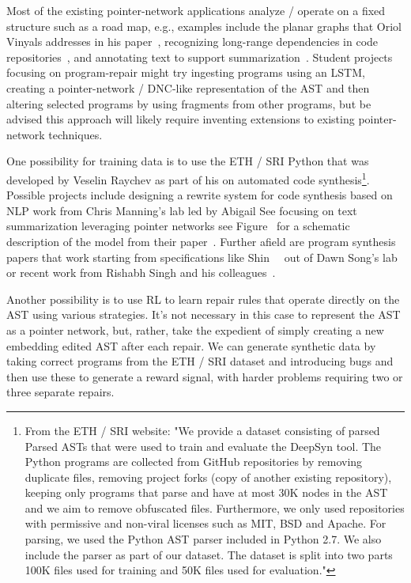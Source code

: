 Most of the existing pointer-network applications analyze / operate on a fixed structure such as a road map, e.g., examples include the planar graphs that Oriol Vinyals addresses in his paper~\cite{VinyalsetalNIPS-15}, recognizing long-range dependencies in code repositories~\cite{BhoopchandetalICLR-17}, and annotating text to support summarization~\cite{SeeetalACL-17}. Student projects focusing on program-repair might try ingesting programs using an LSTM, creating a pointer-network / DNC-like representation of the AST and then altering selected programs by using fragments from other programs, but be advised this approach will likely require inventing extensions to existing pointer-network techniques.

One possibility for training data is to use the ETH / SRI Python {} that was developed by Veselin Raychev as part of his {} on automated code synthesis\footnote{%
%
  From the ETH / SRI website: "We provide a dataset consisting of parsed Parsed ASTs that were used to train and evaluate the DeepSyn tool. The Python programs are collected from GitHub repositories by removing duplicate files, removing project forks (copy of another existing repository), keeping only programs that parse and have at most 30K nodes in the AST and we aim to remove obfuscated files. Furthermore, we only used repositories with permissive and non-viral licenses such as MIT, BSD and Apache. For parsing, we used the Python AST parser included in Python 2.7. We also include the parser as part of our dataset. The dataset is split into two parts \emdash{} 100K files used for training and 50K files used for evaluation."}.
%
Possible projects include designing a rewrite system for code synthesis based on NLP work from Chris Manning's lab led by Abigail See focusing on text summarization leveraging pointer networks \emdash{} see Figure~{} for a schematic description of the model from their paper~\cite{SeeetalACL-17}. Further afield are program synthesis papers that work starting from specifications like Shin~\etal{}~\cite{ShinetalICLR-18b} out of Dawn Song's lab or recent work from Rishabh Singh and his colleagues~\cite{WangetalCoRR-17}.

Another possibility is to use RL to learn repair rules that operate directly on the AST using various strategies. It's not necessary in this case to represent the AST as a pointer network, but, rather, take the expedient of simply creating a new embedding edited AST after each repair. We can generate synthetic data by taking correct programs from the ETH / SRI dataset and introducing bugs and then use these to generate a reward signal, with harder problems requiring two or three separate repairs. 

